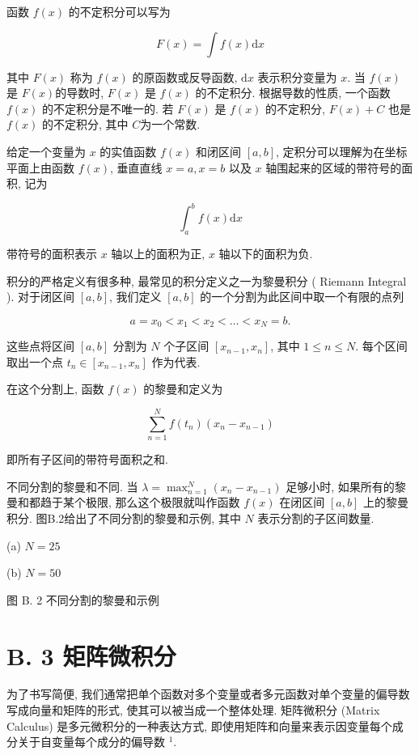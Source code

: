 \documentclass[10pt]{article}
\begin{document}
函数 $f(x)$ 的不定积分可以写为


\begin{equation*}
F(x)=\int f(x) \mathrm{d} x \tag{B.3}
\end{equation*}


其中 $F(x)$ 称为 $f(x)$ 的原函数或反导函数, $\mathrm{d} x$ 表示积分变量为 $x$. 当 $f(x)$ 是 $F(x)$的导数时, $F(x)$ 是 $f(x)$ 的不定积分. 根据导数的性质, 一个函数 $f(x)$ 的不定积分是不唯一的. 若 $F(x)$ 是 $f(x)$ 的不定积分, $F(x)+C$ 也是 $f(x)$ 的不定积分, 其中 $C$为一个常数.

给定一个变量为 $x$ 的实值函数 $f(x)$ 和闭区间 $[a, b]$, 定积分可以理解为在坐标平面上由函数 $f(x)$, 垂直直线 $x=a, x=b$ 以及 $x$ 轴围起来的区域的带符号的面积, 记为


\begin{equation*}
\int_{a}^{b} f(x) \mathrm{d} x \tag{B.4}
\end{equation*}


带符号的面积表示 $x$ 轴以上的面积为正, $x$ 轴以下的面积为负.

积分的严格定义有很多种, 最常见的积分定义之一为黎曼积分 ( Riemann Integral ). 对于闭区间 $[a, b]$, 我们定义 $[a, b]$ 的一个分割为此区间中取一个有限的点列

$$
a=x_{0}<x_{1}<x_{2}<\ldots<x_{N}=b .
$$

这些点将区间 $[a, b]$ 分割为 $N$ 个子区间 $\left[x_{n-1}, x_{n}\right]$, 其中 $1 \leq n \leq N$. 每个区间取出一个点 $t_{n} \in\left[x_{n-1}, x_{n}\right]$ 作为代表.

在这个分割上, 函数 $f(x)$ 的黎曼和定义为


\begin{equation*}
\sum_{n=1}^{N} f\left(t_{n}\right)\left(x_{n}-x_{n-1}\right) \tag{B.5}
\end{equation*}


即所有子区间的带符号面积之和.

不同分割的黎曼和不同. 当 $\lambda=\max _{n=1}^{N}\left(x_{n}-x_{n-1}\right)$ 足够小时, 如果所有的黎曼和都趋于某个极限, 那么这个极限就叫作函数 $f(x)$ 在闭区间 $[a, b]$ 上的黎曼积分. 图B.2给出了不同分割的黎曼和示例, 其中 $N$ 表示分割的子区间数量.



(a) $N=25$



(b) $N=50$

图 B. 2 不同分割的黎曼和示例

\section*{B. 3 矩阵微积分}
为了书写简便, 我们通常把单个函数对多个变量或者多元函数对单个变量的偏导数写成向量和矩阵的形式, 使其可以被当成一个整体处理. 矩阵微积分 (Matrix Calculus) 是多元微积分的一种表达方式, 即使用矩阵和向量来表示因变量每个成分关于自变量每个成分的偏导数 ${ }^{1}$.
\end{document}
